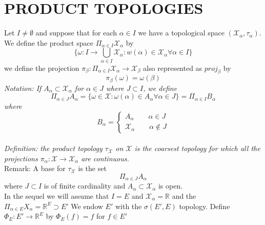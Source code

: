 \documentclass[11pt]{article}
\begin{document}
\section{PRODUCT TOPOLOGIES}
Let $I \ne \emptyset$ and suppose that for each  $\alpha \in I$ we have a topological space  $( \mathcal{X}_\alpha, \tau_\alpha)$. We define the product space
$\Pi_{\alpha \in I} \mathcal{X}_\alpha$ by
\[
    \{ \omega : I \rightarrow \bigcup_{\alpha \in I} \mathcal{X}_\alpha: w(\alpha) \in \mathcal{X}_\alpha \forall \alpha \in I\}
\] 
we define the projection $\pi_\beta : \Pi_{\alpha \in I} \mathcal{X}_\alpha \rightarrow \mathcal{X}_\beta $ also represented as $proj_\beta$  by
 \[
\pi_\beta(\omega) = \omega(\beta)
\] 
\emph{
    Notation: If $A_\alpha \subset \mathcal{X}_\alpha$ for $\alpha \in J$ where $J \subset I$, we define
     \[
         \Pi_{\alpha \in J} A_\alpha = \{\omega \in \mathcal{X}: \omega(\alpha) \in A_\alpha \forall \alpha \in J\} = \Pi_{\alpha \in I} B_\alpha
    \] 
    where
    \[
    B_\alpha = 
    \begin{cases}
        A_\alpha \qquad \alpha \in J\\
        \mathcal{X}_\alpha \qquad \alpha \not\in J
    \end{cases}
    \] 
}
\\
\emph{
    Definition: the product topology $\tau_{ \mathcal{X}}$ on $ \mathcal{X}$ is the coarsest topology for which all the projections $\pi_\alpha : \mathcal{X} \rightarrow \mathcal{X}_\alpha$ are continuous.
}
\\
Remark:  A base for $\tau_{ \mathcal{X}}$ is the set
\[
    \Pi_{\alpha \in J} A_\alpha
\] 
where $J \subset I$ is of finite cardinality and $A_{\alpha} \subset \mathcal{X}_\alpha$ is open.\\
In the sequel we will assume that $I = E$ and  $ \mathcal{X}_\alpha = \mathbb{R}$ and the $\Pi_{\alpha \in E} X_\alpha = \mathbb{R}^{E} \supset E'$ 
We endow $E'$ with the  $\sigma(E', E)$ topology.
Define $\Phi_E: E' \to \mathbb{R}^{E}$ by $\Phi_E(f) = f$ for  $f \in  E'$ 
\end{document}
